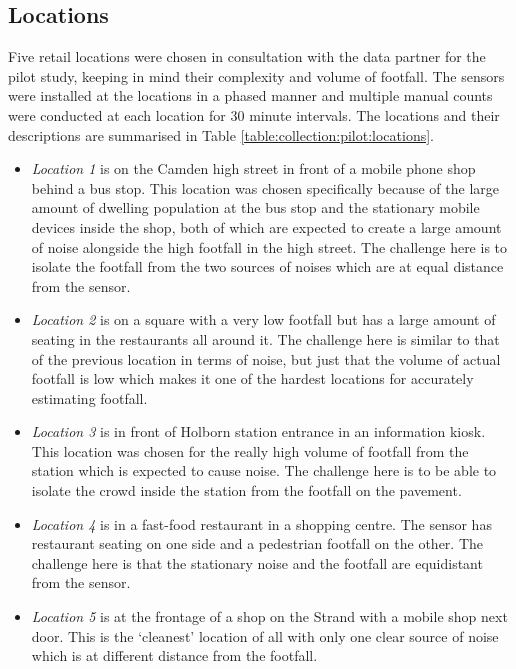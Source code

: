 \subsection{Locations}

Five retail locations were chosen in consultation with the data partner for the pilot study, keeping in mind their complexity and volume of footfall.
The sensors were installed at the locations in a phased manner and multiple manual counts were conducted at each location for 30 minute intervals.
The locations and their descriptions are summarised in Table \ref{table:collection:pilot:locations}.

\begin{itemize}
  \item \textit{Location 1} is on the Camden high street in front of a mobile phone shop behind a bus stop. This location was chosen specifically because of the large amount of dwelling population at the bus stop and the stationary mobile devices inside the shop, both of which are expected to create a large amount of noise alongside the high footfall in the high street. The challenge here is to isolate the footfall from the two sources of noises which are at equal distance from the sensor.
  \item \textit{Location 2} is on a square with a very low footfall but has a large amount of seating in the restaurants all around it. The challenge here is similar to that of the previous location in terms of noise, but just that the volume of actual footfall is low which makes it one of the hardest locations for accurately estimating footfall.
  \item \textit{Location 3} is in front of Holborn station entrance in an information kiosk. This location was chosen for the really high volume of footfall from the station which is expected to cause noise. The challenge here is to be able to isolate the crowd inside the station from the footfall on the pavement.
  \item \textit{Location 4} is in a fast-food restaurant in a shopping centre. The sensor has restaurant seating on one side and a pedestrian footfall on the other. The challenge here is that the stationary noise and the footfall are equidistant from the sensor.
  \item \textit{Location 5} is at the frontage of a shop on the Strand with a mobile shop next door. This is the `cleanest' location of all with only one clear source of noise which is at different distance from the footfall.
\end{itemize}

